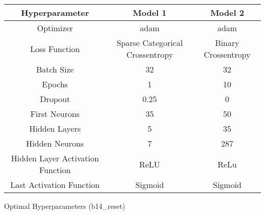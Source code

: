 \begin{tabular}{|c|c|c|}
    \hline
    Hyperparameter & Model 1 & Model 2\\
    \hline
    \hline
    Optimizer & adam &  adam \\
    \hline
    Loss Function & Sparse Categorical Crossentropy &  Binary Crossentropy \\
    \hline
    Batch Size & 32 & 32\\
    \hline
    Epochs & 1 & 10\\
    \hline
    Dropout & 0.25 & 0 \\
    \hline
    First Neurons & 35 & 50\\
    \hline
    Hidden Layers & 5 & 35\\
    \hline
    Hidden Neurons & 7 & 287\\
    \hline
    Hidden Layer Activation Function & ReLU & ReLu\\
    \hline
    Last Activation Function & Sigmoid & Sigmoid\\
    \hline
\end{tabular}
\caption{Optimal Hyperparameters (b14\_reset)}
\label{tab:Optimal Hyperparameters b14}